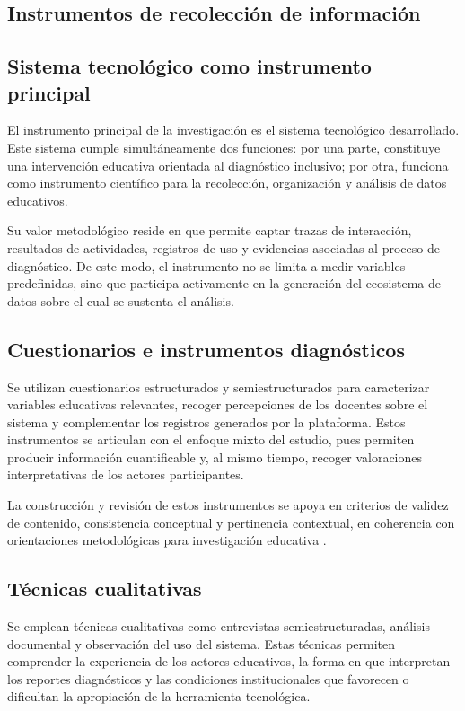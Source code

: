 \begin{refsection}
\section{Instrumentos de recolección de información}

\subsection{Sistema tecnológico como instrumento principal}

El instrumento principal de la investigación es el sistema tecnológico desarrollado. Este sistema cumple simultáneamente dos funciones: por una parte, constituye una intervención educativa orientada al diagnóstico inclusivo; por otra, funciona como instrumento científico para la recolección, organización y análisis de datos educativos.

Su valor metodológico reside en que permite captar trazas de interacción, resultados de actividades, registros de uso y evidencias asociadas al proceso de diagnóstico. De este modo, el instrumento no se limita a medir variables predefinidas, sino que participa activamente en la generación del ecosistema de datos sobre el cual se sustenta el análisis.

\subsection{Cuestionarios e instrumentos diagnósticos}

Se utilizan cuestionarios estructurados y semiestructurados para caracterizar variables educativas relevantes, recoger percepciones de los docentes sobre el sistema y complementar los registros generados por la plataforma. Estos instrumentos se articulan con el enfoque mixto del estudio, pues permiten producir información cuantificable y, al mismo tiempo, recoger valoraciones interpretativas de los actores participantes.

La construcción y revisión de estos instrumentos se apoya en criterios de validez de contenido, consistencia conceptual y pertinencia contextual, en coherencia con orientaciones metodológicas para investigación educativa \parencite{shadish2002,patton2015}.

\subsection{Técnicas cualitativas}

Se emplean técnicas cualitativas como entrevistas semiestructuradas, análisis documental y observación del uso del sistema. Estas técnicas permiten comprender la experiencia de los actores educativos, la forma en que interpretan los reportes diagnósticos y las condiciones institucionales que favorecen o dificultan la apropiación de la herramienta tecnológica.


\end{refsection}
